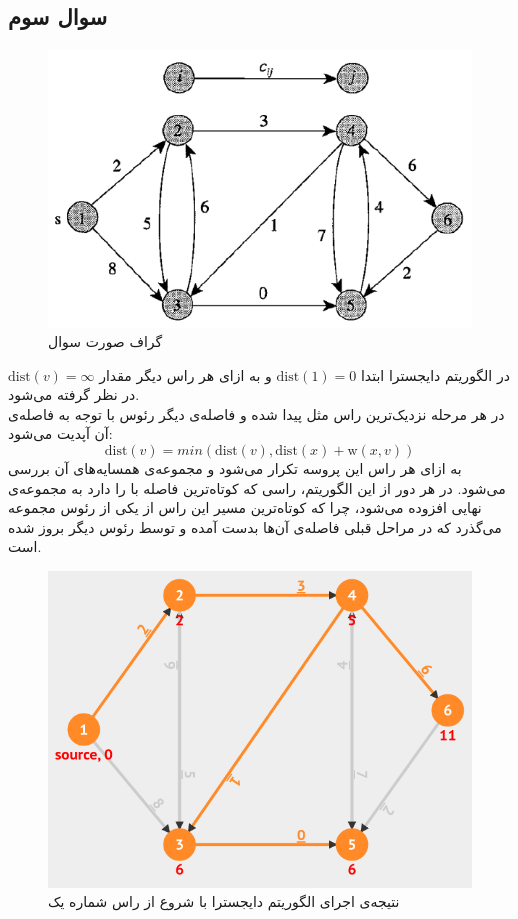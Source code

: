 \documentclass{article}
\begin{document}
\begin{multicols}{2}
\section*{سوال سوم}
\begin{figure}[H]
    \center
    \includegraphics[width=0.75\linewidth]{Photos/HW2/3.png}
    \caption{
    گراف صورت سوال
    }
    \label{fig:my_label}
\end{figure}
در الگوریتم دایجسترا ابتدا
$\text{dist}(1) = 0$
و به ازای هر راس دیگر 
مقدار
$\text{dist}(v) = \infty$
در نظر گرفته می‌شود.\\
در هر مرحله نزدیک‌ترین راس
مثل 
پیدا شده و فاصله‌ی دیگر رئوس با توجه به فاصله‌ی آن آپدیت می‌شود:
$$\text{dist}(v) = min(\text{dist}(v), \text{dist}(x) + \text{w}(x, v))$$
به ازای هر راس این پروسه تکرار می‌شود و مجموعه‌ی همسایه‌های آن بررسی می‌شود. در هر دور از این الگوریتم، راسی که کوتاه‌ترین فاصله با
را دارد به مجموعه‌ی نهایی افزوده می‌شود، چرا که کوتاه‌ترین مسیر این راس از یکی از رئوس مجموعه می‌گذرد که در مراحل قبلی فاصله‌ی آن‌ها بدست آمده و توسط رئوس دیگر بروز شده است.
\begin{figure}[H]
    \center
    \includegraphics[width=0.9\linewidth]{Photos/HW2/dijk.png}
    \caption{
    نتیجه‌ی اجرای الگوریتم دایجسترا با شروع از راس شماره یک
    }
    \label{fig:my_label}
\end{figure}

\end{multicols}
\end{document}
